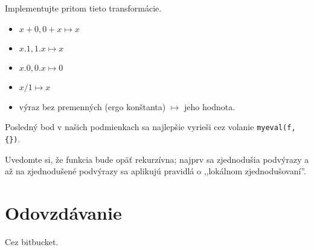 \documentclass{article}
\begin{document}
Implementujte pritom tieto transformácie.
\begin{itemize}
\item $x+0,0+x\mapsto x$
\item $x.1,1.x\mapsto x$
\item $x.0,0.x\mapsto 0$
\item $x/1\mapsto x$
\item výraz bez premenných (ergo konštanta) $\mapsto$ jeho hodnota.
\end{itemize}
Posledný bod v našich podmienkach sa najlepšie vyrieši cez volanie 
{\tt myeval(f,\{\})}.

Uvedomte si, že funkcia bude opäť rekurzívna; najprv sa zjednodušia podvýrazy a
až na zjednodušené podvýrazy sa aplikujú pravidlá o ,,lokálnom zjednodušovaní''.

\begin{framed}

\end{framed}
\section{Odovzdávanie}
Cez bitbucket.
\end{document}
